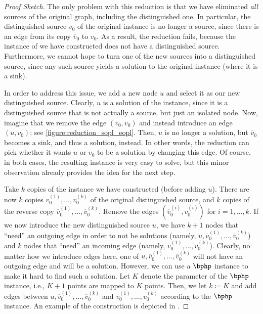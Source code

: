 \begin{proof}[Proof Sketch]
The only problem with this reduction is that we have eliminated \emph{all} sources of the original graph, including the distinguished one. In particular, the distinguished source $v_0$ of the original instance is no longer a source, since there is an edge from its copy $\overline{v}_0$ to $v_0$. As a result, the reduction fails, because the instance of \eopl we have constructed does not have a distinguished source. Furthermore, we cannot hope to turn one of the new sources into a distinguished source, since any such source yields a solution to the original instance (where it is a sink).

In order to address this issue, we add a new node $u$ and select it as our new distinguished source. Clearly, $u$ is a solution of the instance, since it is a distinguished source that is not actually a source, but just an isolated node. Now, imagine that we remove the edge $(\overline{v}_0,v_0)$ and instead introduce an edge $(u,v_0)$; see \cref{figure:reduction_sopl_eopl}. Then, $u$ is no longer a solution, but $\overline{v}_0$ becomes a sink, and thus a solution, instead. In other words, the reduction can pick whether it wants $u$ or $\overline{v}_0$ to be a solution by changing this edge. Of course, in both cases, the resulting instance is very easy to solve, but this minor observation already provides the idea for the next step.

Take $k$ copies of the instance we have constructed (before adding $u$). There are now $k$ copies $v_0^{(1)}, \dots, v_0^{(k)}$ of the original distinguished source, and $k$ copies of the reverse copy $\overline{v}_0^{(1)}, \dots, \overline{v}_0^{(k)}$. Remove the edges $(\overline{v}_0^{(i)}, v_0^{(i)})$ for $i = 1, \dots, k$. If we now introduce the new distinguished source $u$, we have $k+1$ nodes that ``need'' an outgoing edge in order to not be solutions (namely, $u, \overline{v}_0^{(1)}, \dots, \overline{v}_0^{(k)}$) and $k$ nodes that ``need'' an incoming edge (namely, $v_0^{(1)}, \dots, v_0^{(k)}$). Clearly, no matter how we introduce edges here, one of $u, \overline{v}_0^{(1)}, \dots, \overline{v}_0^{(k)}$ will not have an outgoing edge and will be a solution. However, we can use a $\bphp$ instance to make it hard to find such a solution. Let $K$ denote the parameter of the $\bphp$ instance, i.e., $K+1$ points are mapped to $K$ points. Then, we let $k \coloneqq K$ and add edges between $u, \overline{v}_0^{(1)}, \dots, \overline{v}_0^{(k)}$ and $v_0^{(1)}, \dots, v_0^{(k)}$ according to the $\bphp$ instance. An example of the construction is depicted in .




\end{proof}
